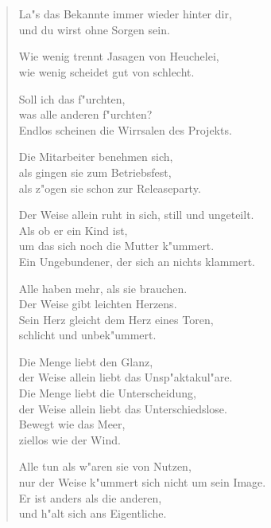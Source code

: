 \documentclass[a4paper,10pt,openany]{book}
\begin{document}
\chapter{}
\begin{verse}
    La"s das Bekannte immer wieder hinter dir,\\
    und du wirst ohne Sorgen sein.

    Wie wenig trennt Jasagen von Heuchelei,\\
    wie wenig scheidet gut von schlecht.

    Soll ich das f"urchten,\\
    was alle anderen f"urchten?\\
    Endlos scheinen die Wirrsalen des Projekts.

    Die Mitarbeiter benehmen sich,\\
    als gingen sie zum Betriebsfest,\\
    als z"ogen sie schon zur Releaseparty.

    Der Weise allein ruht in sich, still und ungeteilt.\\
    Als ob er ein Kind ist,\\
    um das sich noch die Mutter k"ummert.\\
    Ein Ungebundener, der sich an nichts klammert.

    Alle haben mehr, als sie brauchen.\\
    Der Weise gibt leichten Herzens.\\
    Sein Herz gleicht dem Herz eines Toren,\\
    schlicht und unbek"ummert.

    Die Menge liebt den Glanz,\\
    der Weise allein liebt das Unsp"aktakul"are.\\
    Die Menge liebt die Unterscheidung,\\
    der Weise allein liebt das Unterschiedslose.\\
    Bewegt wie das Meer,\\
    ziellos wie der Wind.

    Alle tun als w"aren sie von Nutzen,\\
    nur der Weise k"ummert sich nicht um sein Image.\\
    Er ist anders als die anderen,\\
    und h"alt sich ans Eigentliche.
\end{verse}
\end{document}
